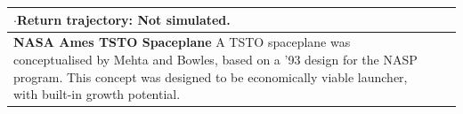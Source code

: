 {\begin{landscape}
\begin{xltabular}{\linewidth}{|X|X|X|}
	
	$\cdot$\textbf{Return trajectory:} Not simulated. 
	
	\\
	\hline \small 
	\textbf{NASA Ames TSTO Spaceplane}\cite{Mehta2001}\newline\newline
	A TSTO spaceplane was conceptualised by Mehta and Bowles\cite{Mehta2001}, based on a '93 design for the NASP program. This concept was designed to be economically viable launcher, with built-in growth potential. 
	&\small
	

\end{xltabular}
\end{landscape}}
